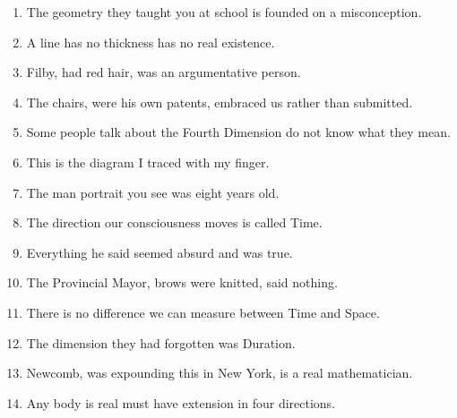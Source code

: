 \documentclass{fiche}
\begin{document}
\entete





\begin{anglais}
\begin{enumerate}[label=\arabic*.,itemsep=2.2mm,leftmargin=*]
  \item The geometry  they taught you at school is founded on a misconception.
  \item A line  has no thickness has no real existence.
  \item Filby,  had red hair, was an argumentative person.
  \item The chairs,  were his own patents, embraced us rather than submitted.
  \item Some people  talk about the Fourth Dimension do not know what they
    mean.
  \item This is the diagram  I traced with my finger.
  \item The man  portrait you see was eight years old.
  \item The direction  our consciousness moves is called Time.
  \item Everything  he said seemed absurd and was true.
  \item The Provincial Mayor,  brows were knitted, said nothing.
  \item There is no difference  we can measure between Time and Space.
  \item The dimension  they had forgotten was Duration.
  \item Newcomb,  was expounding this in New York, is a real mathematician.
  \item Any body  is real must have extension in four directions.
\end{enumerate}
\end{anglais}
\end{document}
